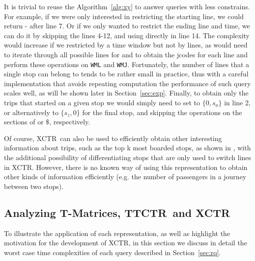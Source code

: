 \documentclass[runningheads]{llncs}
\newcommand{\acumm}{T-Matrices} %
\newcommand{\ctr}{XCTR}
\newcommand{\ttctr}{TTCTR}
\begin{document}
It is trivial to reuse the Algorithm~\ref{alg:xy} to answer queries with less constrains. For example, if we were only interested in restricting the starting line, we could return - after line 7. Or if we only wanted to restrict the ending line and time, we can do it by skipping the lines 4-12, and using directly  in line 14. The complexity would increase if we restricted by a time window but not by lines, as would need to iterate through all possible lines for  and  to obtain the jcodes for each line and perform these operations on \texttt{WML} and \texttt{WMJ}. Fortunately, the number of lines that a single stop can belong to tends to be rather small in practice, thus with a careful implementation that avoids repeating computation the performance of such query scales well, as will be shown later in Section~\ref{sec:exp}. Finally, to obtain only the trips that started on a given stop we would simply need to set  to $\{0,s_a\}$ in line 2, or alternatively to $\{s_z,0\}$ for the final stop, and skipping the operations on the sections of  or $\$$, respectively.

Of course, \ctr~can also be used to efficiently obtain other interesting information about trips, such as the top k most boarded stops, as shown in \cite{brisaboa2018compact}, with the additional possibility of differentiating stops that are only used to switch lines in \ctr. However, there is no known way of using this representation to obtain other kinds of information efficiently (e.g. the number of passengers in a journey between two stops).

\subsection{Analyzing \acumm, \ttctr~and \ctr}
\label{sec:comp}
To illustrate the application of each representation, as well as highlight the motivation for the development of \ctr, in this section we discuss in detail the worst case time complexities of each query described in Section~\ref{sec:rq}.
\end{document}
